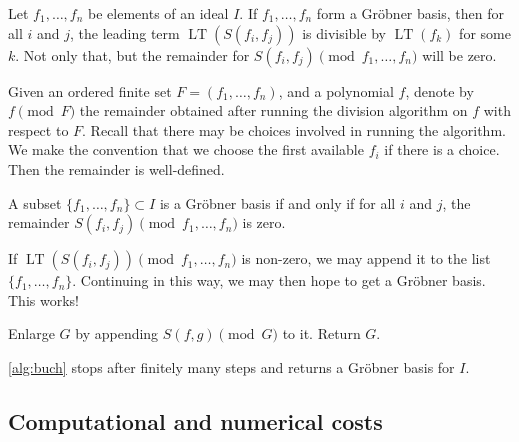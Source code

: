 \documentclass[11pt]{article}
\DeclareMathOperator{\LT}{LT}
\begin{document}
Let $f_1, \dots, f_n$ be elements of an ideal $I$.
If $f_1, \dots, f_n$ form a Gr\"obner basis, then for all $i$ and $j$, the leading term $\LT(S(f_i,f_j))$ is divisible by $\LT(f_k)$ for some $k$.
Not only that, but the remainder for $S(f_i,f_j) \pmod {f_1, \dots, f_n}$ will be zero.

Given an ordered finite set $F = (f_1, \dots, f_n)$, and a polynomial $f$, denote by $f \pmod F$ the remainder obtained after running the division algorithm on $f$ with respect to $F$.
Recall that there may be choices involved in running the algorithm.
We make the convention that we choose the first available $f_i$ if there is a choice.
Then the remainder is well-defined.
\begin{proposition}
  A subset $\{f_1, \dots, f_n\} \subset I$ is a Gr\"obner basis if and only if for all $i$ and $j$, the remainder $S(f_i,f_j) \pmod {f_1, \dots, f_n}$ is zero.
\end{proposition}
If $\LT(S(f_i,f_j)) \pmod {f_1,\dots, f_n}$ is non-zero, we may append it to the list $\{f_1, \dots, f_n\}$.
Continuing in this way, we may then hope to get a Gr\"obner basis.
This works!

\begin{algorithm}
  {
    Enlarge $G$ by appending $S(f,g) \pmod G$ to it.
  }
  Return $G$.
  \bigskip

  \caption{Buchberger's algorithm to construct a Gr\"obner basis}
  \label{alg:buch}
\end{algorithm}

\begin{proposition}
  \autoref{alg:buch} stops after finitely many steps and returns a Gr\"obner basis for $I$.
\end{proposition}

\subsection{Computational and numerical costs}




\end{document}

